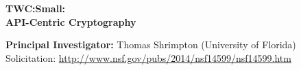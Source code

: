 \documentclass[10pt]{article}
\newcommand{\mytitle}{TWC:Small:\\
  \smallskip API-Centric Cryptography}
\begin{document}
\vspace*{1.0in}
\begin{center}

{\Large\bf \mytitle}

\vspace*{.5in}

\medskip
\noindent\textbf{Principal Investigator:} Thomas Shrimpton (University of Florida)\\


\medskip
Solicitation: \url{http://www.nsf.gov/pubs/2014/nsf14599/nsf14599.htm}

\end{center}
\thispagestyle{empty}

\iffalse

\clearpage
\setcounter{page}{1}


\fi

\clearpage
\renewcommand{\thepage}{D-\arabic{page}}
\setcounter{page}{1}










%





%

\clearpage
\renewcommand{\thepage}{M-\arabic{page}}
\setcounter{page}{1}

\end{document}
